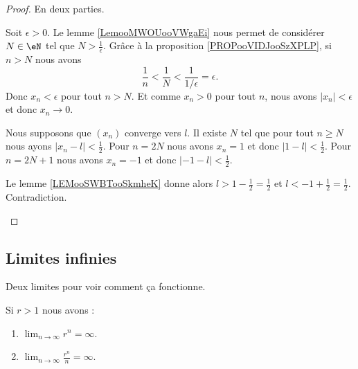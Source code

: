 \begin{proof}
	En deux parties.
	\begin{subproof}
		Soit \( \epsilon>0\). Le lemme \ref{LemooMWOUooVWgaEi} nous permet de considérer \( N\in \eN\) tel que \( N>\frac{1}{ \epsilon}\). Grâce à la proposition \ref{PROPooVIDJooSzXPLP}, si \( n>N\) nous avons
		\begin{equation}
			\frac{1}{  n}<\frac{1}{ N}<\frac{1}{ 1/\epsilon}=\epsilon.
		\end{equation}
		Donc \( x_n<\epsilon\) pour tout \( n>N\). Et comme \( x_n>0\) pour tout \( n\), nous avons \( | x_n |<\epsilon\) et donc \( x_n\to 0\).

		Nous supposons que \( (x_n)\) converge vers \( l\). Il existe \( N\) tel que pour tout \( n\geq N\) nous ayons \( | x_n-l |<\frac{1}{ 2}\). Pour \( n=2N\) nous avons \( x_n=1\) et donc \( | 1-l |<\frac{1}{ 2}\). Pour \( n=2N+1\) nous avons \( x_n=-1\) et donc \( | -1-l |<\frac{1}{ 2}\).

		Le lemme \ref{LEMooSWBTooSkmheK} donne alors \( l>1-\frac{ 1 }{2}=\frac{ 1 }{2}\) et \( l<-1+\frac{ 1 }{2}=\frac{ 1 }{2}\). Contradiction.
	\end{subproof}
\end{proof}

\subsection{Limites infinies}

Deux limites pour voir comment ça fonctionne.
\begin{lemma}       \label{LEMooWCRSooWXVvcc}
	Si \( r>1\) nous avons :
	\begin{enumerate}
		\item
		      \( \lim_{n\to \infty} r^n=\infty\).
		\item
		      \( \lim_{n\to \infty} \frac{ r^n }{ n }=\infty\).
	\end{enumerate}
\end{lemma}

